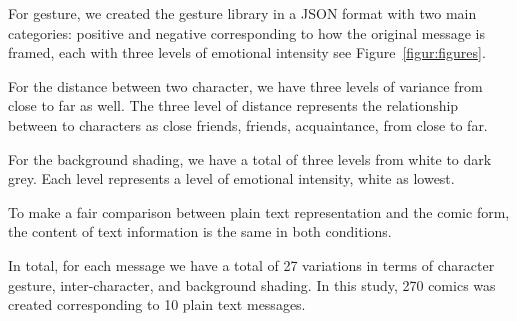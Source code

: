 For gesture, we created the gesture library in a JSON format with two main categories: positive and negative corresponding to how the original message is framed, each with three levels of emotional intensity see Figure~\ref{figur:figures}. \par
For the distance between two character, we have three levels of variance from close to far as well. The three level of distance represents the relationship between to characters as close friends, friends, acquaintance, from close to far. \par
For the background shading, we have a total of three levels from white to dark grey. Each level represents a level of emotional intensity, white as lowest. \par
To make a fair comparison between plain text representation and the comic form, the content of text information is the same in both conditions.  \par
In total, for each message we have a total of 27 variations in terms of character gesture, inter-character, and background shading. In this study, 270 comics was created corresponding to 10 plain text messages. \par

